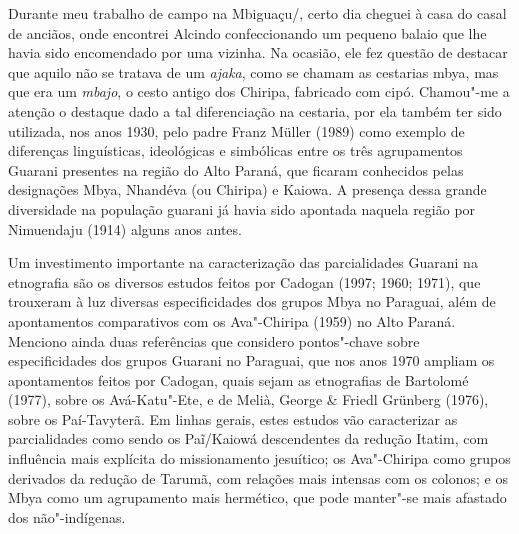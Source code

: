  


Durante meu trabalho de campo na  Mbiguaçu/, certo dia cheguei à
casa do casal de anciãos, onde encontrei Alcindo confeccionando um
pequeno balaio que lhe havia sido encomendado por uma vizinha. Na
ocasião, ele fez questão de destacar que aquilo não se tratava de um
\emph{ajaka}, como se chamam as cestarias mbya, mas que era um \emph{mbajo}, o cesto
antigo dos Chiripa, fabricado com cipó. Chamou"-me a atenção o destaque
dado a tal diferenciação na cestaria, por ela também ter sido
utilizada, nos anos 1930, pelo padre Franz Müller (1989) como exemplo
de diferenças linguísticas, ideológicas e simbólicas entre os três
agrupamentos Guarani presentes na região do Alto Paraná, que ficaram
conhecidos pelas designações Mbya, Nhandéva (ou Chiripa) e Kaiowa. A
presença dessa grande diversidade na população guarani já havia sido
apontada naquela região por Nimuendaju (1914) alguns anos antes.

Um investimento importante na caracterização das parcialidades Guarani
na etnografia são os diversos estudos feitos por Cadogan (1997;
1960; 1971), que trouxeram à luz diversas
especificidades dos grupos Mbya no Paraguai, além de apontamentos
comparativos com os Ava"-Chiripa (1959) no Alto Paraná. Menciono ainda
duas referências que considero pontos"-chave sobre
especificidades dos grupos Guarani no Paraguai, que nos anos 1970
ampliam os apontamentos feitos por Cadogan, quais sejam as etnografias
de Bartolomé (1977), sobre os Avá-Katu"-Ete, e de Melià,
George \& Friedl Grünberg (1976), sobre os Paí-Tavyterã. Em linhas
gerais, estes estudos vão caracterizar as parcialidades como sendo os
Paĩ/Kaiowá descendentes da redução
Itatim, com influência mais explícita do missionamento jesuítico; os
Ava"-Chiripa como grupos derivados da redução de Tarumã, com relações
mais intensas com os colonos; e os Mbya como um agrupamento mais
hermético, que pode manter"-se mais afastado dos não"-indígenas. 

